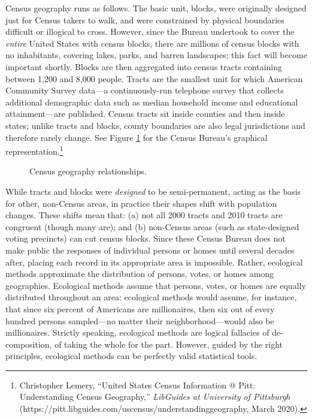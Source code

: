 \documentclass[12pt,oneside]{psthesis}
\begin{document}
Census geography runs as follows.
The basic unit, blocks, were originally designed just for Census takers to walk, and were constrained by physical boundaries difficult or illogical to cross.
However, since the Bureau undertook to cover the \emph{entire} United States with census blocks, there are millions of census blocks with no inhabitants, covering lakes, parks, and barren landscapes; this fact will become important shortly.
Blocks are then aggregated into census tracts containing between 1,200 and 8,000 people.
Tracts are the smallest unit for which American Community Survey data---a continuously-run telephone survey that collects additional demographic data such as median household income and educational attainment---are published.
Census tracts sit inside counties and then inside states; unlike tracts and blocks, county boundaries are also legal jurisdictions and therefore rarely change.
See Figure \ref{fig:geography} for the Census Bureau's graphical representation.\footnote{Christopher Lemery, ``United States Census Information @ Pitt: Understanding Census Geography,'' \emph{LibGuides at University of Pittsburgh} (https://pitt.libguides.com/uscensus/understandinggeography, March 2020).}
\begin{figure}

{\centering {}

}

\caption{Census geography relationships.}\label{fig:geography}
\end{figure}
While tracts and blocks were \emph{designed} to be semi-permanent, acting as the basis for other, non-Census areas, in practice their shapes shift with population changes.
These shifts mean that: (a) not all 2000 tracts and 2010 tracts are congruent (though many are); and (b) non-Census areas (such as state-designed voting precincts) can cut census blocks.
Since these Census Bureau does not make public the responses of individual persons or homes until several decades after, placing each record in its appropriate area is impossible.
Rather, ecological methods approximate the distribution of persons, votes, or homes among geographies.
Ecological methods assume that persons, votes, or homes are equally distributed throughout an area: ecological methods would assume, for instance, that since six percent of Americans are millionaires, then six out of every hundred persons sampled---no matter their neighborhood---would also be millionaires.
Strictly speaking, ecological methods are logical fallacies of de-composition, of taking the whole for the part.
However, guided by the right principles, ecological methods can be perfectly valid statistical tools.
\end{document}
